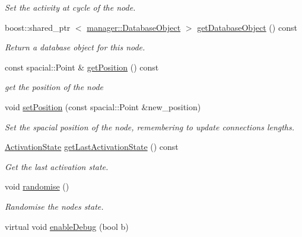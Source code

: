 \begin{DoxyCompactItemize}
\begin{DoxyCompactList}\small\item\em \-Set the activity at cycle of the node. \end{DoxyCompactList}\item 
boost\-::shared\-\_\-ptr\*
$<$ \hyperlink{classcryomesh_1_1manager_1_1DatabaseObject}{manager\-::\-Database\-Object} $>$ \hyperlink{classcryomesh_1_1components_1_1Node_a811e64601504ff99536c2680429c7582}{get\-Database\-Object} () const 
\begin{DoxyCompactList}\small\item\em \-Return a database object for this node. \end{DoxyCompactList}\item 
const spacial\-::\-Point \& \hyperlink{classcryomesh_1_1components_1_1Node_a313531f48e1ccc3902fdeb313d41bd7b}{get\-Position} () const 
\begin{DoxyCompactList}\small\item\em get the position of the node \end{DoxyCompactList}\item 
void \hyperlink{classcryomesh_1_1components_1_1Node_a970e8e8ae18053bd9e087ce7faf720de}{set\-Position} (const spacial\-::\-Point \&new\-\_\-position)
\begin{DoxyCompactList}\small\item\em \-Set the spacial position of the node, remembering to update connections lengths. \end{DoxyCompactList}\item 
\hyperlink{classcryomesh_1_1components_1_1Node_a291becdd589b5bd338d5c0dd28199798}{\-Activation\-State} \hyperlink{classcryomesh_1_1components_1_1Node_ac0f6e2c8823c98dc3d85091b2deef3f7}{get\-Last\-Activation\-State} () const 
\begin{DoxyCompactList}\small\item\em \-Get the last activation state. \end{DoxyCompactList}\item 
void \hyperlink{classcryomesh_1_1components_1_1Node_a5ec290205a68a8635a740ae32608cebf}{randomise} ()
\begin{DoxyCompactList}\small\item\em \-Randomise the nodes state. \end{DoxyCompactList}\item 
virtual void \hyperlink{classcryomesh_1_1components_1_1Node_a42acc61b6b0d590433215535d3bc67cd}{enable\-Debug} (bool b)
\item 

\end{DoxyCompactItemize}
